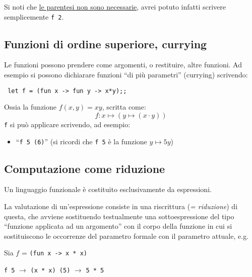 \documentclass[a4paper,10pt]{article}
\begin{document}
Si noti che \underline{le parentesi non sono necessarie}, avrei potuto infatti scrivere semplicemente \texttt{f 2}.

\subsection{Funzioni di ordine superiore, currying}

Le funzioni possono prendere come argomenti, o restituire, altre funzioni. Ad esempio si possono dichiarare funzioni ``di più parametri'' (currying) scrivendo:

\begin{lstlisting}
 let f = (fun x -> fun y -> x*y);;
\end{lstlisting}

Ossia la funzione $f(x, y) = xy$, scritta come: \[f : x \mapsto (y \mapsto (x \cdot y)) \] \texttt{f} si può applicare scrivendo, ad esempio:

\begin{itemize}
 \item ``\texttt{f 5 (6)}'' (si ricordi che \texttt{f 5} è la funzione $y \mapsto 5y$)
 \end{itemize}
\subsection{Computazione come riduzione}
\label{com_com_rid}
Un linguaggio funzionale è costituito esclusivamente da espressioni.\smallskip

La valutazione di un'espressione consiste in una riscrittura (\emph{= riduzione}) di questa, che avviene sostituendo testualmente una sottoespressione del tipo ``funzione applicata ad un argomento'' con il corpo della funzione in cui si sostituiscono le occorrenze del parametro formale con il parametro attuale, e.g.

\begin{multicols}{2}

\begin{center}
Sia $f$ = \texttt{(fun x -> x * x)}
\end{center}


\begin{center}
 \texttt{f 5} \quad $\to$ \quad \texttt{(x * x) (5)} \quad $\to$ \quad \texttt{5 * 5}
\end{center}
\end{multicols}
\end{document}
